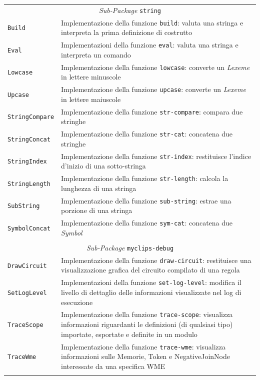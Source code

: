 \begin{longtable}{p{3.5cm}p{8.5cm}}
\multicolumn{2}{c}{\emph{Sub-Package} \texttt{string}}\\
	\hdashline[5pt/5pt]
		\texttt{Build} & Implementazione della funzione \texttt{build}: valuta una stringa e interpreta la prima definizione di costrutto\\ 
	\hdashline[1pt/5pt]
		\texttt{Eval} & Implementazioni della funzione \texttt{eval}: valuta una stringa e interpreta un comando\\ 
	\hdashline[1pt/5pt]
		\texttt{Lowcase} & Implementazione della funzione \texttt{lowcase}: converte un \emph{Lexeme} in lettere minuscole\\ 
	\hdashline[1pt/5pt]
		\texttt{Upcase} & Implementazione della funzione \texttt{upcase}: converte un \emph{Lexeme} in lettere maiuscole\\ 
	\hdashline[1pt/5pt]
		\texttt{StringCompare} & Implementazione della funzione \texttt{str-compare}: compara due stringhe\\ 
	\hdashline[1pt/5pt]
		\texttt{StringConcat} & Implementazione della funzione \texttt{str-cat}: concatena due stringhe\\ 
	\hdashline[1pt/5pt]
		\texttt{StringIndex} & Implementazione della funzione \texttt{str-index}: restituisce l'indice d'inizio di una sotto-stringa\\ 
	\hdashline[1pt/5pt]
		\texttt{StringLength} & Implementazione della funzione \texttt{str-length}: calcola la lunghezza di una stringa\\ 
	\hdashline[1pt/5pt]
		\texttt{SubString} & Implementazione della funzione \texttt{sub-string}: estrae una porzione di una stringa\\ 
	\hdashline[1pt/5pt]
		\texttt{SymbolConcat} & Implementazione della funzione \texttt{sym-cat}: concatena due \emph{Symbol}\\ 
	\hline\\	

\multicolumn{2}{c}{\emph{Sub-Package} \texttt{myclips-debug}}\\
	\hdashline[5pt/5pt]
		\texttt{DrawCircuit} & Implementazione della funzione \texttt{draw-circuit}: restituisce una visualizzazione grafica del circuito compilato di una regola\\ 
	\hdashline[1pt/5pt]
		\texttt{SetLogLevel} & Implementazioni della funzione \texttt{set-log-level}: modifica il livello di dettaglio delle informazioni visualizzate nel log di esecuzione\\ 
	\hdashline[1pt/5pt]
		\texttt{TraceScope} & Implementazione della funzione \texttt{trace-scope}: visualizza informazioni riguardanti le definizioni (di qualsiasi tipo) importate, esportate e definite in un modulo\\ 
	\hdashline[1pt/5pt]
		\texttt{TraceWme} & Implementazione della funzione \texttt{trace-wme}: visualizza informazioni sulle Memorie, Token e NegativeJoinNode interessate da una specifica WME\\ 
	\hline\\


\end{longtable}
